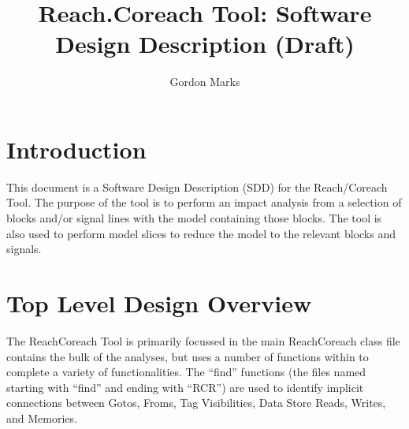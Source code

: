 \documentclass[12pt,letterpaper]{report}
\begin{document}
	
	\title{Reach.Coreach Tool: Software Design Description (Draft)}
	
	\author{
		Gordon Marks\\
	}
	
	\maketitle
	
	\tableofcontents
	
	\chapter{Introduction}
	
	\par This document is a Software Design Description (SDD) for the Reach/Coreach Tool. 
	The purpose of the tool is to perform an impact analysis from a selection of blocks and/or signal lines with the model containing those blocks.
	The tool is also used to perform model slices to reduce the model to the relevant blocks and signals. 
	
	
	\chapter{Top Level Design Overview} \label{TopLevelDesign}
	
	\par The ReachCoreach Tool is primarily focussed in the main ReachCoreach class file contains the bulk of the analyses, but uses a number of functions within to complete a variety of functionalities.
	The ``find'' functions (the files named starting with ``find'' and ending with ``RCR'') are used to identify implicit connections between Gotos, Froms, Tag Visibilities, Data Store Reads, Writes, and Memories.
	
\end{document}
